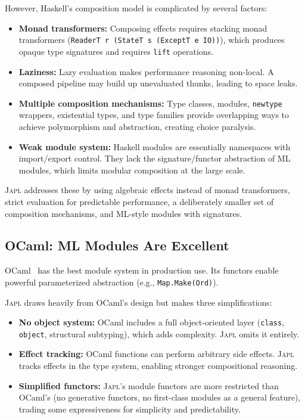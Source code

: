 \documentclass[11pt,a4paper]{article}
\newcommand{\japl}{\textsc{Japl}}
\begin{document}
However, Haskell's composition model is complicated by several factors:
\begin{itemize}
  \item \textbf{Monad transformers:} Composing effects requires stacking monad transformers (\texttt{ReaderT r (StateT s (ExceptT e IO))}), which produces opaque type signatures and requires \texttt{lift} operations.
  \item \textbf{Laziness:} Lazy evaluation makes performance reasoning non-local. A composed pipeline may build up unevaluated thunks, leading to space leaks.
  \item \textbf{Multiple composition mechanisms:} Type classes, modules, \texttt{newtype} wrappers, existential types, and type families provide overlapping ways to achieve polymorphism and abstraction, creating choice paralysis.
  \item \textbf{Weak module system:} Haskell modules are essentially namespaces with import/export control. They lack the signature/functor abstraction of ML modules, which limits modular composition at the large scale.
\end{itemize}

\japl{} addresses these by using algebraic effects instead of monad transformers, strict evaluation for predictable performance, a deliberately smaller set of composition mechanisms, and ML-style modules with signatures.

\subsection{OCaml: ML Modules Are Excellent}

OCaml~\citep{leroy2020ocaml} has the best module system in production use. Its functors enable powerful parameterized abstraction (e.g., \texttt{Map.Make(Ord)}).

\japl{} draws heavily from OCaml's design but makes three simplifications:
\begin{itemize}
  \item \textbf{No object system:} OCaml includes a full object-oriented layer (\texttt{class}, \texttt{object}, structural subtyping), which adds complexity. \japl{} omits it entirely.
  \item \textbf{Effect tracking:} OCaml functions can perform arbitrary side effects. \japl{} tracks effects in the type system, enabling stronger compositional reasoning.
  \item \textbf{Simplified functors:} \japl{}'s module functors are more restricted than OCaml's (no generative functors, no first-class modules as a general feature), trading some expressiveness for simplicity and predictability.
\end{itemize}
\end{document}
